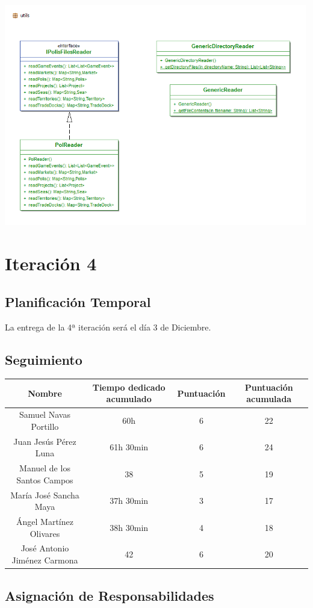 \documentclass[11 pt]{book}
\begin{document}
\begin{center}
		    \includegraphics[width=500px]{design-uml/iteration3/package-utils.png}
		\end{center}
		
\chapter{Iteración 4}
	\section{Planificación Temporal}
		La entrega de la 4ª iteración será el día 3 de Diciembre.

	\section{Seguimiento}
		\begin{tabular}{|c|c|c|c|}
			\hline
			Nombre & Tiempo dedicado acumulado & Puntuación & Puntuación acumulada\\
			\hline
			Samuel Navas Portillo & 60h & 6 & 22\\
			Juan Jesús Pérez Luna & 61h 30min & 6 & 24\\
			Manuel de los Santos Campos & 38 & 5 & 19\\
			María José Sancha Maya & 37h 30min & 3 & 17\\
			Ángel Martínez Olivares & 38h 30min & 4 & 18\\
			José Antonio Jiménez Carmona & 42 & 6 & 20\\
			\hline
		\end{tabular}

	\section{Asignación de Responsabilidades}
		
\end{document}
